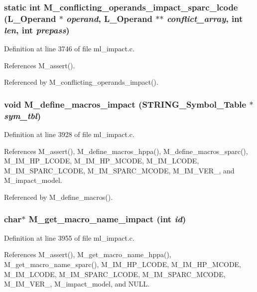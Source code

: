 \subsubsection{\setlength{\rightskip}{0pt plus 5cm}static int M\_\-conflicting\_\-operands\_\-impact\_\-sparc\_\-lcode (L\_\-Operand $\ast$ {\em operand}, L\_\-Operand $\ast$$\ast$ {\em conflict\_\-array}, int {\em len}, int {\em prepass})\hspace{0.3cm}{\tt  [static]}}\label{ml__impact_8c_fd0373a48011e9abbce11298103ad69b}




Definition at line 3746 of file ml\_\-impact.c.

References M\_\-assert().

Referenced by M\_\-conflicting\_\-operands\_\-impact().
\subsubsection{\setlength{\rightskip}{0pt plus 5cm}void M\_\-define\_\-macros\_\-impact (\bf{STRING\_\-Symbol\_\-Table} $\ast$ {\em sym\_\-tbl})}\label{ml__impact_8c_0e3e1a774dd4511d032a382c6d873d70}




Definition at line 3928 of file ml\_\-impact.c.

References M\_\-assert(), M\_\-define\_\-macros\_\-hppa(), M\_\-define\_\-macros\_\-sparc(), M\_\-IM\_\-HP\_\-LCODE, M\_\-IM\_\-HP\_\-MCODE, M\_\-IM\_\-LCODE, M\_\-IM\_\-SPARC\_\-LCODE, M\_\-IM\_\-SPARC\_\-MCODE, M\_\-IM\_\-VER\_, and M\_\-impact\_\-model.

Referenced by M\_\-define\_\-macros().
\subsubsection{\setlength{\rightskip}{0pt plus 5cm}char$\ast$ M\_\-get\_\-macro\_\-name\_\-impact (int {\em id})}\label{ml__impact_8c_445e0d3936d21b3a448d064579eab029}




Definition at line 3955 of file ml\_\-impact.c.

References M\_\-assert(), M\_\-get\_\-macro\_\-name\_\-hppa(), M\_\-get\_\-macro\_\-name\_\-sparc(), M\_\-IM\_\-HP\_\-LCODE, M\_\-IM\_\-HP\_\-MCODE, M\_\-IM\_\-LCODE, M\_\-IM\_\-SPARC\_\-LCODE, M\_\-IM\_\-SPARC\_\-MCODE, M\_\-IM\_\-VER\_, M\_\-impact\_\-model, and NULL.


